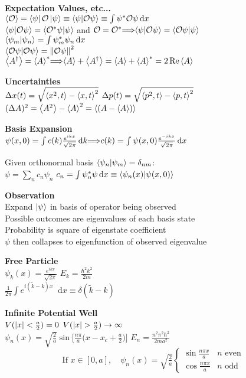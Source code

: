 \documentclass[11pt, a4paper]{article}
\newcommand{\newsec}[1]{\vspace{2mm}\textbf{#1}\\}
\newcommand{\diff}{\mathop{}\!\mathrm{d}} %
\let\spaceyimplies\implies
\renewcommand{\implies}{\hspace{-1mm}\spaceyimplies\hspace{-1mm}}
\renewcommand{\O}{\mathcal{O}}  %
\newcommand{\evb}[1]{\big \langle {#1} \big \rangle}  %
\begin{document}
\begin{multicols}{2}
\newsec{Expectation Values, etc...}
$ \ev{\O} =  \bra{\psi}\O\ket{\psi} \equiv \braket{\psi}{\O\psi} \equiv \int \psi^{*} \O \psi \diff x $\\
$ \braket{\psi}{\O \psi} = \braket{\O^{*}\psi}{\psi} $ and $ \O = \O^{*} \implies \braket{\psi}{\O\psi} = \braket{\O\psi}{\psi}$\\
$ \braket{\psi_{m}}{\psi_{n}} = \int \psi_{m}^{*}\psi_{n}\diff x $\\
$ \braket{\O\psi}{\O\psi} = \norm{\O\psi}^{2} $\\
$ \evb{A^{\dagger}} = \ev{A}^{*} \implies \ev{A} + \ev{A^{\dagger}} = \ev{A} + \ev{A}^{*} = 2 \Re \ev{A} $


\newsec{Uncertainties}
$ \Delta x(t) = \sqrt{\ev{x^{2}, t} - \ev{x, t}^{2}} $ \quad $ \Delta p(t) = \sqrt{\ev{p^{2}, t} - \ev{p, t}^{2}} $\\
$ (\Delta A)^{2} = \expval{A^{2}} - \expval{A}^{2} = \expval{(A - \expval{A})}  $


\newsec{Basis Expansion}
$ \psi(x, 0) = \int  c(k)\frac{e^{ikx}}{\sqrt{2\pi}} \diff k \implies c(k) = \int \psi(x, 0)\frac{e^{-ikx}}{\sqrt{2\pi}}\diff x  $

Given orthonormal basis $\braket{\psi_n}{\psi_m} = \delta_{nm}$: \\
$\psi= \sum_n c_n \psi_n$ \qquad $c_n = \int \psi_n^* \psi \diff x \equiv \braket{\psi_n(x)}{\psi(x, 0)}$ 


\newsec{Observation}
Expand $ \ket{\psi} $ in basis of operator being observed\\
Possible outcomes are eigenvalues of each basis state\\
Probability is square of eigenstate coefficient\\
$ \psi $ then collapses to eigenfunction of observed eigenvalue


\newsec{Free Particle}
$ \psi_{k}(x) = \frac{e^{ikx}}{\sqrt{2\pi}} $ \qquad $ E_{k} = \frac{\hbar^{2}k^{2}}{2m} $\\
$ \frac{1}{2\pi} \int e^{i(\tilde{k}-k)x}\diff x \equiv \delta(\tilde{k} - k) $

\newsec{Infinite Potential Well}
$ V(\abs{x} < \frac{a}{2}) = 0 $ \qquad $ V(\abs{x} > \frac{a}{2}) \to \infty $\\
$ \psi_{n}(x) = \sqrt{\frac{2}{a}}\sin \big[\frac{n\pi}{a}\big(x - x_{c} + \frac{a}{2}\big)\big] $ \quad $ E_{n} = \frac{n^{2}\pi^{2}\hbar^{2}}{2ma^{2}} $\\[-2mm]
\[ \text{If } x \in [0, a], \quad \psi_{n}(x) =\sqrt{\tfrac{2}{a}}
\begin{cases}
	\sin \frac{n\pi x}{a} & n \text{ even}\\
	\cos \frac{n\pi x}{a} & n \text{ odd}
\end{cases}
\]


\end{multicols}
\end{document}
